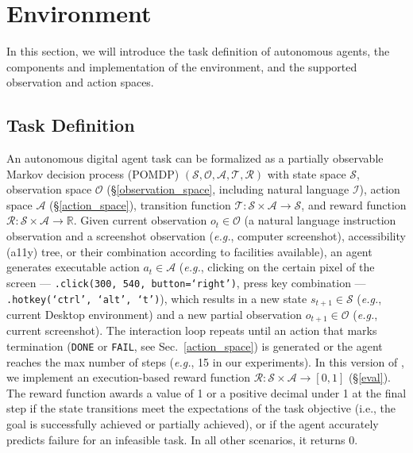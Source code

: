 \section{\ours Environment}
\label{sec:environment}
\vspace{-5pt}

In this section, we will introduce the task definition of autonomous agents, the components and implementation of the \ours environment, and the supported observation and action spaces.

\subsection{Task Definition}
An autonomous digital agent task can be formalized as a partially observable Markov decision process (POMDP) $(\mathcal{S}, \mathcal{O}, \mathcal{A}, \mathcal{T}, \mathcal{R})$ 
with state space $\mathcal{S}$, observation space $\mathcal{O}$ (\S\ref{observation_space}, including natural language $\mathcal{I}$), action space $\mathcal{A}$ (\S\ref{action_space}), transition function $\mathcal{T}: \mathcal{S} \times \mathcal{A} \to \mathcal{S}$, and reward function $\mathcal{R}: \mathcal{S} \times \mathcal{A} \to \mathbb{R}$.
Given current observation $o_{t} \in \mathcal{O}$ (a natural language instruction observation and a screenshot observation (\textit{e.g.}, computer screenshot), accessibility (a11y) tree, or their combination according to facilities available), an agent generates executable action $a_t \in \mathcal{A}$ (\textit{e.g.}, clicking on the certain pixel of the screen --- \texttt{.click(300, 540, button=`right')}, press key combination --- \texttt{.hotkey(`ctrl', `alt', `t')}), which results in a new state $s_{t+1} \in \mathcal{S}$ (\textit{e.g.}, current Desktop environment) and a new partial observation $o_{t+1} \in \mathcal{O}$ (\textit{e.g.}, current screenshot).
The interaction loop repeats until an action that marks termination (\verb|DONE| or \verb|FAIL|, see Sec.~\ref{action_space}) is generated or the agent reaches the max number of steps (\textit{e.g.}, 15 in our experiments).
In this version of \ours, we implement an execution-based reward function $\mathcal{R}: \mathcal{S} \times \mathcal{A} \to [0, 1]$ (\S\ref{eval}). 
The reward function awards a value of 1 or a positive decimal under 1 at the final step if the state transitions meet the expectations of the task objective (i.e., the goal is successfully achieved or partially achieved), or if the agent accurately predicts failure for an infeasible task.
In all other scenarios, it returns 0.


